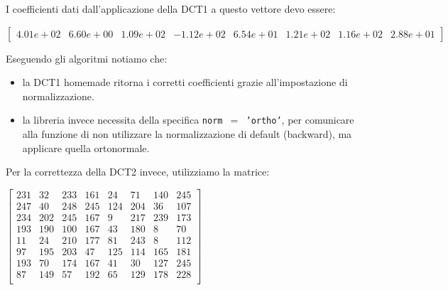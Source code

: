 I coefficienti dati dall'applicazione della DCT1 a questo vettore devo essere:
\begin{center}
	$
	\begin{bmatrix}
		4.01e+02 & 6.60e+00 & 1.09e+02 & -1.12e+02 & 6.54e+01 & 1.21e+02 & 1.16e+02 & 2.88e+01
	\end{bmatrix}
	$
\end{center}

Eseguendo gli algoritmi notiamo che:
\begin{itemize}
	\item la DCT1 homemade ritorna i corretti coefficienti grazie all'impostazione di normalizzazione.
	\item la libreria invece necessita della specifica \texttt{norm $=$ 'ortho'}, per comunicare alla funzione di non utilizzare la normalizzazione di default (backward), ma applicare quella ortonormale.
\end{itemize}

Per la correttezza della DCT2 invece, utilizziamo la matrice:
\begin{center}		
	$
	\begin{bmatrix}
		231 & 32 & 233 & 161 & 24 & 71 & 140 & 245 \\
		247 & 40 & 248 & 245 & 124 & 204 & 36 & 107 \\
		234 & 202 & 245 & 167 & 9 & 217 & 239 & 173 \\
		193 & 190 & 100 & 167 & 43 & 180 & 8 & 70 \\
		11 & 24  & 210  & 177 & 81 & 243 & 8 & 112 \\
		97 & 195 & 203 & 47 & 125 & 114 & 165 & 181 \\
		193 & 70 & 174 & 167 & 41 & 30 & 127 & 245 \\
		87 & 149 & 57 & 192 & 65 & 129 & 178 & 228 \\
	\end{bmatrix}
	$
\end{center}

